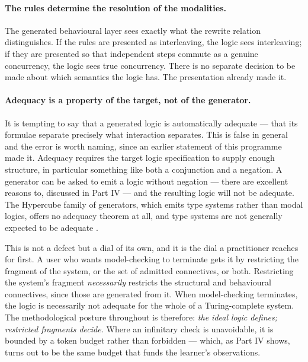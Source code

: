 \paragraph{The rules determine the resolution of the modalities.} The generated
behavioural layer sees exactly what the rewrite relation distinguishes. If the
rules are presented as interleaving, the logic sees interleaving; if they are
presented so that independent steps commute as a genuine concurrency, the logic
sees true concurrency. There is no separate decision to be made about which
semantics the logic has. The presentation already made it.

\paragraph{Adequacy is a property of the target, not of the generator.} It is
tempting to say that a generated logic is automatically adequate --- that its
formulae separate precisely what interaction separates. This is false in general
and the error is worth naming, since an earlier statement of this programme made
it. Adequacy requires the target logic specification to supply enough structure,
in particular something like both a conjunction and a negation. A generator can
be asked to emit a logic without negation --- there are excellent reasons to,
discussed in Part IV --- and the resulting logic will not be adequate. The
Hypercube family of generators, which emits type systems rather than modal
logics, offers no adequacy theorem at all, and type systems are not generally
expected to be adequate \cite{GsltOmnibus}.

This is not a defect but a dial of its own, and it is the dial a practitioner
reaches for first. A user who wants model-checking to terminate gets it by
restricting the fragment of the system, or the set of admitted connectives, or
both. Restricting the system's fragment \emph{necessarily} restricts the
structural and behavioural connectives, since those are generated from it. When
model-checking terminates, the logic is necessarily not adequate for the whole of
a Turing-complete system. The methodological posture throughout is therefore:
\emph{the ideal logic defines; restricted fragments decide.} Where an infinitary
check is unavoidable, it is bounded by a token budget rather than forbidden ---
which, as Part IV shows, turns out to be the same budget that funds the learner's
observations.


